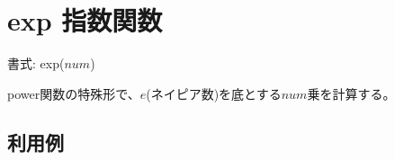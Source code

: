 
%

\section{exp 指数関数\label{sect:exp}}

書式: exp($num$)

power関数の特殊形で、$e$(ネイピア数)を底とする$num$乗を計算する。

\subsection*{利用例}


%
